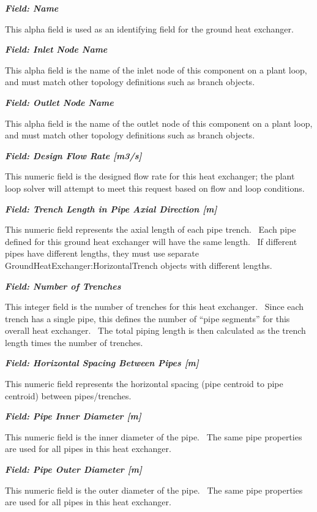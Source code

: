 \textbf{\emph{Field: Name}}

This alpha field is used as an identifying field for the ground heat exchanger.

\textbf{\emph{Field: Inlet Node Name}}

This alpha field is the name of the inlet node of this component on a plant loop, and must match other topology definitions such as branch objects.

\textbf{\emph{Field: Outlet Node Name}}

This alpha field is the name of the outlet node of this component on a plant loop, and must match other topology definitions such as branch objects.

\textbf{\emph{Field: Design Flow Rate {[}m3/s{]}}}

This numeric field is the designed flow rate for this heat exchanger; the plant loop solver will attempt to meet this request based on flow and loop conditions.

\textbf{\emph{Field: Trench Length in Pipe Axial Direction {[}m{]}}}

This numeric field represents the axial length of each pipe trench.~ Each pipe defined for this ground heat exchanger will have the same length.~ If different pipes have different lengths, they must use separate GroundHeatExchanger:HorizontalTrench objects with different lengths.

\textbf{\emph{Field: Number of Trenches}}

This integer field is the number of trenches for this heat exchanger.~ Since each trench has a single pipe, this defines the number of ``pipe segments'' for this overall heat exchanger.~ The total piping length is then calculated as the trench length times the number of trenches.

\textbf{\emph{Field: Horizontal Spacing Between Pipes {[}m{]}}}

This numeric field represents the horizontal spacing (pipe centroid to pipe centroid) between pipes/trenches.

\textbf{\emph{Field: Pipe Inner Diameter {[}m{]}}}

This numeric field is the inner diameter of the pipe.~ The same pipe properties are used for all pipes in this heat exchanger.

\textbf{\emph{Field: Pipe Outer Diameter {[}m{]}}}

This numeric field is the outer diameter of the pipe.~ The same pipe properties are used for all pipes in this heat exchanger.

